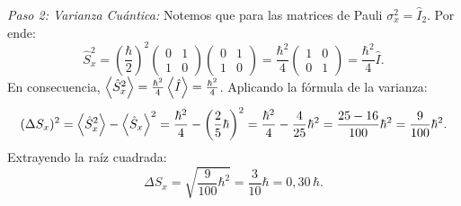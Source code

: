 \begin{ejemplobox}
    \textit{Paso 2: Varianza Cuántica:}
    Notemos que para las matrices de Pauli $\sigma_x^2 = \hat{I}_2$. Por ende:
    \begin{equation}
        \hat{S}_x^2 = \left(\frac{\hbar}{2}\right)^2 \begin{pmatrix} 0 & 1 \\ 1 & 0 \end{pmatrix}\begin{pmatrix} 0 & 1 \\ 1 & 0 \end{pmatrix} = \frac{\hbar^2}{4}\begin{pmatrix} 1 & 0 \\ 0 & 1 \end{pmatrix} = \frac{\hbar^2}{4}\hat{I}.
    \end{equation}
    En consecuencia, $\left\langle \hat{S}_x^2 \right\rangle = \frac{\hbar^2}{4}\left\langle \hat{I} \right\rangle = \frac{\hbar^2}{4}$. Aplicando la fórmula de la varianza:
    \begin{equation}
        (\Delta S_x)^2 = \left\langle \hat{S}_x^2 \right\rangle - \left\langle \hat{S}_x \right\rangle^2 = \frac{\hbar^2}{4} - \left(\frac{2}{5}\hbar\right)^2 = \frac{\hbar^2}{4} - \frac{4}{25}\hbar^2 = \frac{25 - 16}{100}\hbar^2 = \frac{9}{100}\hbar^2.
    \end{equation}
    Extrayendo la raíz cuadrada:
    \begin{equation}
        \Delta S_x = \sqrt{\frac{9}{100}\hbar^2} = \frac{3}{10}\hbar = 0{,}30\,\hbar.
    \end{equation}


\end{ejemplobox}

